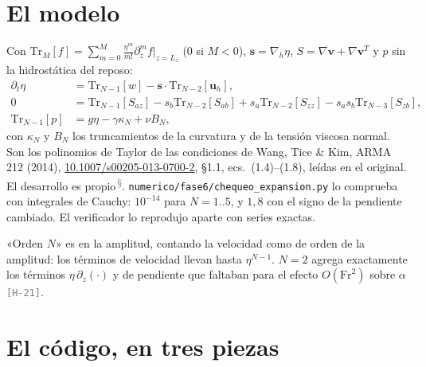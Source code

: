 \documentclass[11pt,a4paper]{article}
\newcommand{\etq}[1]{\textcolor{gray}{\texttt{[#1]}}}
\newcommand{\archivo}[1]{\nolinkurl{#1}}
\newcommand{\propio}{\textsuperscript{\textcolor{gray}{\,\S}}}
\newcommand{\Tr}{\mathrm{Tr}}
\begin{document}
\section{El modelo}

Con $\Tr_M[f]=\sum_{m=0}^{M}\frac{\eta^m}{m!}\partial_z^m f\big|_{z=L_z}$ ($0$ si $M<0$),
$\mathbf s=\nabla_h\eta$, $S=\nabla\mathbf v+\nabla\mathbf v^{T}$ y $p$ sin la hidrostática del reposo:
\begin{align*}
\partial_t\eta &= \Tr_{N-1}[w]-\mathbf s\cdot\Tr_{N-2}[\mathbf u_h],\\
0 &= \Tr_{N-1}[S_{az}] - s_b\Tr_{N-2}[S_{ab}] + s_a\Tr_{N-2}[S_{zz}] - s_as_b\Tr_{N-3}[S_{zb}],\\
\Tr_{N-1}[p] &= g\eta-\gamma\kappa_N+\nu B_N ,
\end{align*}
con $\kappa_N$ y $B_N$ los truncamientos de la curvatura y de la tensión viscosa normal. Son los
polinomios de Taylor de las condiciones de Wang, Tice \& Kim, ARMA 212 (2014),
\href{https://doi.org/10.1007/s00205-013-0700-2}{10.1007/s00205-013-0700-2}, §1.1,
ecs.~(1.4)--(1.8), leídas en el original. El desarrollo es propio\propio.
\archivo{numerico/fase6/chequeo_expansion.py} lo comprueba con integrales de Cauchy: $10^{-14}$
para $N=1..5$, y $1{,}8$ con el signo de la pendiente cambiado. El verificador lo reprodujo
aparte con series exactas.

«Orden $N$» es en la amplitud, contando la velocidad como de orden de la amplitud: los términos
de velocidad llevan hasta $\eta^{N-1}$. $N=2$ agrega exactamente los términos $\eta\,\partial_z(\cdot)$
y de pendiente que faltaban para el efecto $O(\mathrm{Fr}^2)$ sobre $\alpha$ \etq{H-21}.

\section{El código, en tres piezas}
\end{document}
